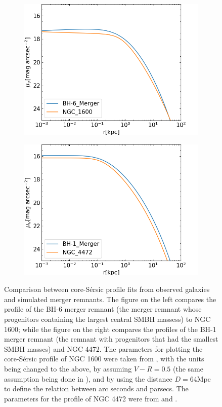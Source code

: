 \documentclass[english, oneside]{HYgradu}
\begin{document}
\begin{figure}
	\centering
	\begin{subfigure}[b]{0.49\textwidth}
		\includegraphics[width=\textwidth]{BH-6_NGC1600.png}
	\end{subfigure}
	\begin{subfigure}[b]{0.49\textwidth}
		\includegraphics[width=\textwidth]{BH-1_NGC4472.png}
	\end{subfigure}
	\caption{Comparison between core-Sérsic profile fits from observed galaxies and simulated merger remnants. The figure on the left compares the profile of the BH-6 merger remnant (the merger remnant whose progenitors containing the largest central SMBH massess) to NGC 1600; while the figure on the right compares the profiles of the BH-1 merger remnant (the remnant with progenitors that had the smallest SMBH masses) and NGC 4472. The parameters for plotting the core-Sérsic profile of NGC 1600 were taken from \cite{Thomas2016}, with the units being changed to the above, by assuming $V - R = 0.5$ (the same assumption being done in \cite{Lauer2007}), and by using the distance $D = 64 \mathrm{Mpc}$ \citep{Thomas2016} to define the relation between arc seconds and parsecs. The parameters for the profile of NGC 4472 were from \cite{Dullo2012} and \cite{Lauer2007}.}
	\label{figure:profile_comparison}
\end{figure}
\end{document}
